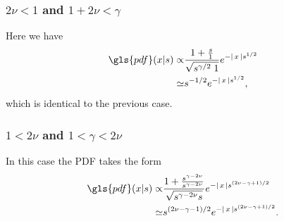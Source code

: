 \subsubsection{$2\nu<1$ and $1 + 2\nu<\gamma$}

Here we have 
%
\begin{align}
\gls{pdf}(x|s) \propto & \frac{1+\frac{s}{1}}{\sqrt{s^{\gamma /2 } \; 1}} e^{-\abs{x} s^{1/2}}  \\
\simeq & s^{-1/2} e^{-\abs{x} s^{1/2}} ,
\end{align}
%
which is identical to the previous case.

\subsubsection{$1<2\nu$ and $1 <\gamma<2\nu$}

In this case the \gls{PDF} takes the form 
%
\begin{align}
\gls{pdf}(x|s) \propto & \frac{1+\frac{s^{\gamma -2\nu}}{s^{\gamma -2\nu}}}{\sqrt{s^{\gamma -2\nu} s}} e^{-\abs{x} s^{(2\nu-\gamma+1)/2}}  \\
\simeq & s^{(2 \nu-\gamma-1)/2} e^{-\abs{x} s^{(2\nu-\gamma+1)/2}} .
\end{align}

